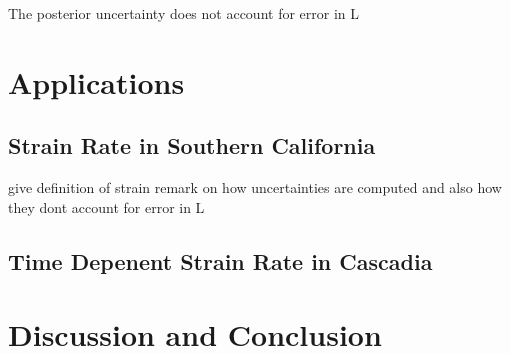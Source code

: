 \documentclass[10pt,a4paper]{article}
\begin{document}
The posterior uncertainty does not account for error in L  

\section{Applications}\label{sec:Applications}

\subsection{Strain Rate in Southern California}\label{sec:ApplicationsSoCal}
give definition of strain
remark on how uncertainties are computed and also how they dont account for error in L

\subsection{Time Depenent Strain Rate in Cascadia}\label{sec:ApplicationsCascadia}

\section{Discussion and Conclusion}\label{sec:Discussion}




  
 
\end{document}
